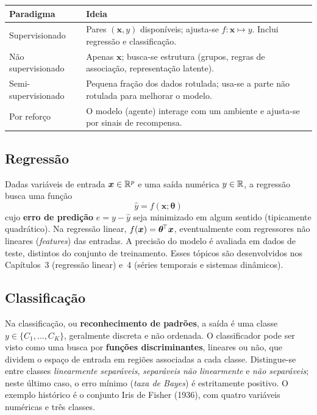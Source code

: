 \begin{center}\small
\begin{tabular}{@{}l p{8.6cm}@{}}
\toprule
\textbf{Paradigma} & \textbf{Ideia} \\
\midrule
Supervisionado    & Pares $(\bm{x},y)$ disponíveis; ajusta-se
$f:\bm{x}\mapsto y$. Inclui regressão e classificação. \\
Não supervisionado & Apenas $\bm{x}$; busca-se estrutura (grupos, regras
de associação, representação latente). \\
Semi-supervisionado & Pequena fração dos dados rotulada; usa-se a parte
não rotulada para melhorar o modelo. \\
Por reforço       & O modelo (agente) interage com um ambiente e ajusta-se
por sinais de recompensa. \\
\bottomrule
\end{tabular}
\end{center}

\subsection{Regressão}

Dadas variáveis de entrada $\bm{x}\in\mathbb{R}^p$ e uma saída numérica
$y\in\mathbb{R}$, a regressão busca uma função
\[
\hat{y} = f(\bm{x};\bm{\theta})
\]
cujo \textbf{erro de predição} $e=y-\hat{y}$ seja minimizado em algum
sentido (tipicamente quadrático). Na regressão linear,
$f(\bm{x})=\bm{\theta}^{\!\top}\bm{x}$, eventualmente com regressores não
lineares (\emph{features}) das entradas. A precisão do modelo é avaliada
em dados de teste, distintos do conjunto de treinamento. Esses tópicos
são desenvolvidos nos Capítulos~3 (regressão linear) e~4 (séries
temporais e sistemas dinâmicos).

\subsection{Classificação}

Na classificação, ou \textbf{reconhecimento de padrões}, a saída é uma
classe $y\in\{C_1,\dots,C_K\}$, geralmente discreta e não ordenada. O
classificador pode ser visto como uma busca por \textbf{funções
discriminantes}, lineares ou não, que dividem o espaço de entrada em
regiões associadas a cada classe. Distingue-se entre classes
\emph{linearmente separáveis}, \emph{separáveis não linearmente} e
\emph{não separáveis}; neste último caso, o erro mínimo (\emph{taxa de
Bayes}) é estritamente positivo. O exemplo histórico é o conjunto Iris
de Fisher (1936), com quatro variáveis numéricas e três classes.

